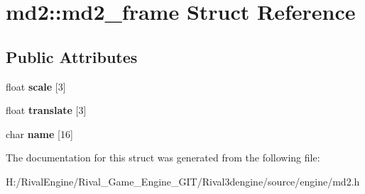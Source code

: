 \hypertarget{structmd2_1_1md2__frame}{}\section{md2\+:\+:md2\+\_\+frame Struct Reference}
\label{structmd2_1_1md2__frame}
\subsection*{Public Attributes}
\begin{DoxyCompactItemize}
\item 
\mbox{\label{structmd2_1_1md2__frame_a006b4bbe9e4f35c984f8205f81f244f5}} 
float {\bfseries scale} \mbox{[}3\mbox{]}
\item 
\mbox{\label{structmd2_1_1md2__frame_a10f724cb4086676a61c83879087794a5}} 
float {\bfseries translate} \mbox{[}3\mbox{]}
\item 
\mbox{\label{structmd2_1_1md2__frame_a9cf3321504cf82b1ac67ac3ba23c2a5d}} 
char {\bfseries name} \mbox{[}16\mbox{]}
\end{DoxyCompactItemize}


The documentation for this struct was generated from the following file\+:\begin{DoxyCompactItemize}
\item 
H\+:/\+Rival\+Engine/\+Rival\+\_\+\+Game\+\_\+\+Engine\+\_\+\+G\+I\+T/\+Rival3dengine/source/engine/md2.\+h\end{DoxyCompactItemize}
